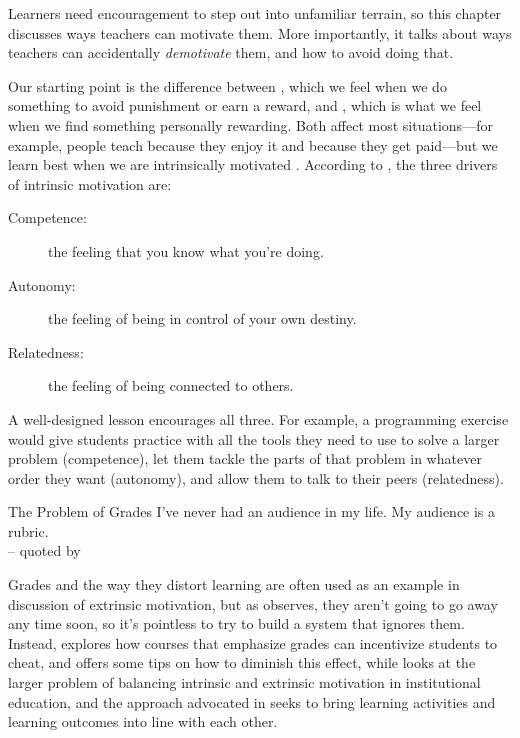 
Learners need encouragement to step out into unfamiliar terrain, so this
chapter discusses ways teachers can motivate them. More importantly, it
talks about ways teachers can accidentally \emph{demotivate} them, and how to
avoid doing that.

Our starting point is the difference between , which we feel when we do
something to avoid punishment or earn a reward, and , which is what we feel when we
find something personally rewarding. Both affect most situations---for
example, people teach because they enjoy it and because they get
paid---but we learn best when we are intrinsically motivated
\cite{Wlod2017}. According to , the three drivers of intrinsic
motivation are:

\begin{description}
\item[Competence:]
the feeling that you know what you're doing.
\item[Autonomy:]
the feeling of being in control of your own destiny.
\item[Relatedness:]
the feeling of being connected to others.
\end{description}

A well-designed lesson encourages all three. For example, a programming
exercise would give students practice with all the tools they need to
use to solve a larger problem (competence), let them tackle the parts of
that problem in whatever order they want (autonomy), and allow them to
talk to their peers (relatedness).

\begin{aside}{The Problem of Grades}
  I've never had an audience in my life. My audience is a rubric.\\
  -- quoted by 

  Grades and the way they distort learning are often used as an
  example in discussion of extrinsic motivation, but as
  \cite{Mill2016a} observes, they aren't going to go away any time
  soon, so it's pointless to try to build a system that ignores
  them. Instead, \cite{Lang2013} explores how courses that
  emphasize grades can incentivize students to cheat, and offers some
  tips on how to diminish this effect, while \cite{Covi2017} looks
  at the larger problem of balancing intrinsic and extrinsic
  motivation in institutional education, and the  approach advocated in
  \cite{Bigg2011} seeks to bring learning activities and learning
  outcomes into line with each other.
\end{aside}

